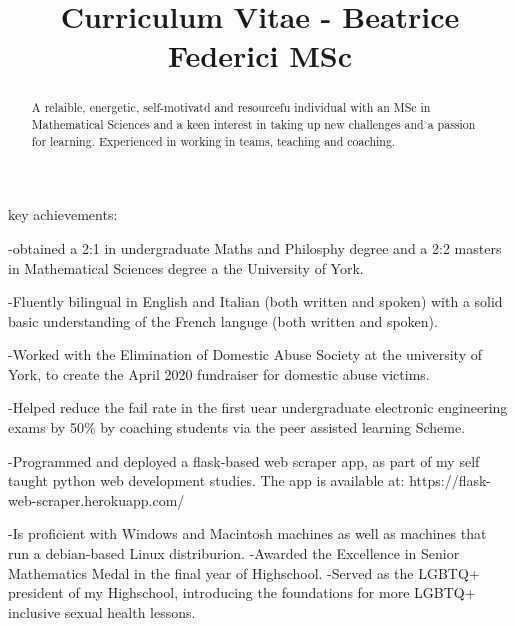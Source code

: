 \documentclass{article}
\begin{document}
\title{Curriculum Vitae - Beatrice Federici MSc}

\maketitle


\begin{abstract}
  A relaible, energetic, self-motivatd and resourcefu individual with an MSc in Mathematical
  Sciences and a keen interest in taking up new challenges and a passion for learning.
  Experienced in working in teams, teaching and coaching.
\end{abstract}

\begin{section}
key achievements:\par
-obtained a 2:1 in undergraduate Maths and Philosphy degree and a 2:2 masters in Mathematical Sciences degree a the University of York.\par
-Fluently bilingual in English and Italian (both written and spoken) with a solid basic understanding of the French languge (both written and spoken).\par
-Worked with the Elimination of Domestic Abuse Society at the university of York, to create the April 2020 fundraiser for domestic abuse victims.\par
-Helped reduce the fail rate in the first uear undergraduate electronic engineering exams by 50\% by coaching students via the peer assisted learning Scheme.\par
-Programmed and deployed a flask-based web scraper app, as part of my self taught python web development studies. The app is available at:
https://flask-web-scraper.herokuapp.com/ \par
-Is proficient with Windows and Macintosh machines as well as machines that run a debian-based Linux distriburion.
-Awarded the Excellence in Senior Mathematics Medal in the final year of Highschool.
-Served as the LGBTQ+ president of my Highschool, introducing the foundations for more LGBTQ+ inclusive sexual health lessons.

\end{section}
\end{document}
